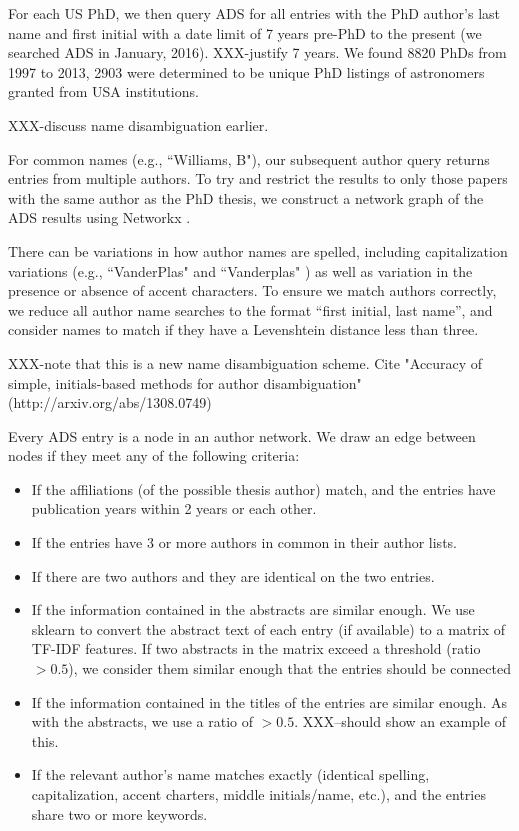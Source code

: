 \documentclass[preprint2]{aastex}
\begin{document}
For each US PhD, we then query ADS for all entries with the PhD author's last name and first initial with a date limit of 7 years pre-PhD to the present (we searched ADS in January, 2016). XXX-justify 7 years.  We found 8820 PhDs from 1997 to 2013, 2903 were determined to be unique PhD listings of astronomers granted from USA institutions. 

XXX-discuss name disambiguation earlier. 

For common names (e.g.,  ``Williams, B"), our subsequent author query returns entries from multiple authors.  To try and restrict the results to only those papers with the same author as the PhD thesis, we construct a network graph of the ADS results using Networkx \citet{networkx}.

There can be variations in how author names are spelled, including capitalization variations (e.g., ``VanderPlas" \citep{VanderPlas12} and ``Vanderplas" \citep{van12}) as well as variation in the presence or absence of accent characters.  To ensure we match authors correctly, we reduce all author name searches to the format ``first initial, last name'', and consider names to match if they have a Levenshtein distance less than three.

XXX-note that this is a new name disambiguation scheme. Cite "Accuracy of simple, initials-based methods for author disambiguation" (http://arxiv.org/abs/1308.0749)

Every ADS entry is a node in an author network. We draw an edge between nodes if they meet any of the following criteria:

\begin{itemize}
\item{If the affiliations (of the possible thesis author) match, and the entries have publication years within 2 years or each other.}
\item{If the entries have 3 or more authors in common in their author lists.}
\item{If there are two authors and they are identical on the two entries.}
\item{If the information contained in the abstracts are similar enough.  We use sklearn \citet{scikit-learn} to convert the abstract text of each entry (if available) to a matrix of TF-IDF features.  If two abstracts in the matrix exceed a threshold (ratio $> 0.5$), we consider them similar enough that the entries should be connected}
\item{If the information contained in the titles of the entries are similar enough.  As with the abstracts, we use a ratio of $>0.5$. XXX--should show an example of this.}
\item{If the relevant author's name matches exactly (identical spelling, capitalization, accent charters, middle initials/name, etc.), and the entries share two or more keywords.}
\end{itemize}
\end{document}
